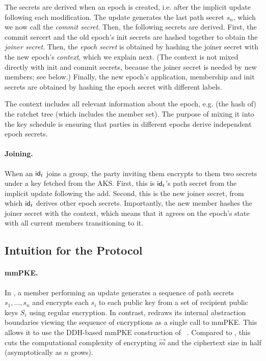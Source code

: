 The secrets are derived when an epoch is created, i.e. after the implicit update following each modification. The update
generates the last path secret $s_n$, which we now call the \emph{commit secret}. Then, the following secrets are
derived. First, the commit sercert and the old epoch's init secrets are hashed together to obtain the \emph{joiner
  secret}. Then, the \emph{epoch secret} is obtained by hashing the joiner secret with the new epoch's \emph{context}, which we explain next. (The context is not mixed directly with init and commit secrets, because the joiner secret is needed by new members; see below.) Finally, the new epoch's application, membership and init secrets are obtained by hashing the epoch secret with different labels.

The context includes all relevant information about the epoch, e.g. (the hash of) the ratchet tree (which includes the member set). The purpose of mixing it into the key schedule is ensuring that parties in different epochs derive independent epoch secrets.

\paragraph{Joining.}
When an ${\mathsf{id}}_t$ joins a group, the party inviting them encrypts to them two secrets under a key fetched from the AKS. First, this is ${\mathsf{id}}_t$'s path secret from the implicit update following the add. Second, this is the new joiner secret, from which ${\mathsf{id}}_t$ derives other epoch secrets.
Importantly, the new member hashes the joiner secret with the context, which means that it agrees on the epoch's state with all current members transitioning to it.
%
\subsection{Intuition for the \saik Protocol}\label{sec:intuition2}
\paragraph{mmPKE.}
In \protITK, a member performing an update generates a sequence of path secrets $s_1, \dots, s_n$ and encrypts each $s_i$ to each public key from a set of recipient public keys $S_i$ using regular encryption.
In contrast, \saik redraws its internal abstraction boundaries viewing the sequence of encryptions as a single call to mmPKE.
This allows it to use the DDH-based mmPKE construction of
~\cite{ASIACCS:PinPoeSch14}. Compared to \protITK, this cuts the
computational complexity of encrypting $\vec m$ and the ciphertext
size in half (asymptotically as $n$ grows).


